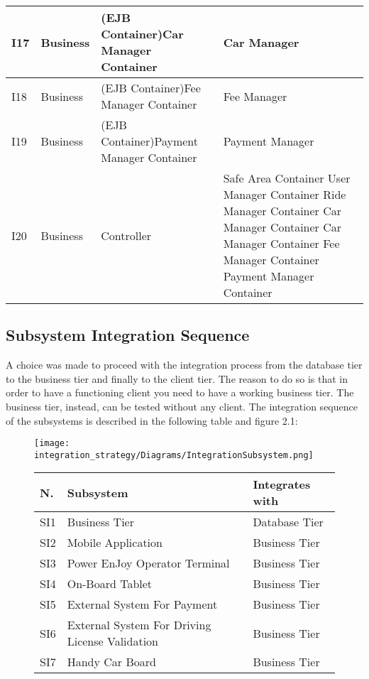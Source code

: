 \begin{longtable}{| m{1cm}| m{} | m{4cm} | m{} | }
\hline
I17 & Business & (EJB Container)Car Manager Container & Car Manager\\
\hline
I18 & Business & (EJB Container)Fee Manager Container & Fee Manager\\
\hline
I19 & Business & (EJB Container)Payment Manager Container & Payment Manager\\
\hline
I20 & Business & Controller & Safe Area Container \newline User Manager Container \newline Ride Manager Container \newline Car Manager Container \newline Car Manager Container \newline Fee Manager Container \newline Payment Manager Container\\
\hline
\end{longtable}

\subsection{Subsystem Integration Sequence}
A choice was made to proceed with the integration process from the database tier to the business tier and finally to the client tier. The reason to do so is that in order to have a functioning client you need to have a working business tier. The business tier, instead, can be tested without any client. 
The integration sequence of the subsystems is described in the following table and figure 2.1:
\begin{figure}
	\centering
	\texttt{[image: integration\_strategy/Diagrams/IntegrationSubsystem.png]}
	\caption{Order of integration of the subsystems.}
	\label{fig:subsystems}
		
\begin{longtable}{| m{1cm}| m{4cm}| m{4cm} | }
\hline
\textbf{N.} & \textbf{Subsystem} & \textbf{Integrates with}\\
\hline
SI1 & Business Tier & Database Tier\\
\hline
SI2 & Mobile Application & Business Tier\\
\hline
SI3 & Power EnJoy Operator Terminal & Business Tier\\
\hline
SI4 & On-Board Tablet & Business Tier\\
\hline
SI5 & External System For Payment & Business Tier\\
\hline
SI6 & External System For Driving License Validation & Business Tier\\
\hline
SI7 & Handy Car Board & Business Tier\\
\hline
\end{longtable}


\end{figure}

